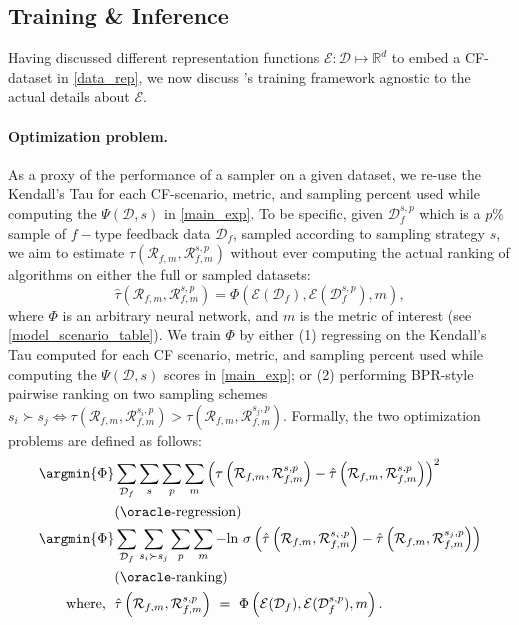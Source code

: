 \subsection{Training \& Inference} \label{oracle_architecture}
Having discussed different representation functions $\mathcal{E} : \mathcal{D} \mapsto \mathbb{R}^d$ to embed a CF-dataset in \cref{data_rep}, we now discuss \oracle's training framework agnostic to the actual details about $\mathcal{E}$. 

\paragraph{Optimization problem.} As a proxy of the performance of a sampler on a given dataset, we re-use the Kendall's Tau for each CF-scenario, metric, and sampling percent used while computing the $\Psi(\mathcal{D}, s)$ in \cref{main_exp}. To be specific, given $\mathcal{D}_{f}^{s, p}$ which is a $p\%$ sample of $f-$type feedback data $\mathcal{D}_f$, sampled according to sampling strategy $s$, we aim to estimate $\tau(\mathcal{R}_{f, m}, \mathcal{R}_{f, m}^{s, p})$ without ever computing the actual ranking of algorithms 
on either the full or sampled datasets:
\begin{equation} \label{tau_hat}
    \hat{\tau}\left(\mathcal{R}_{f, m}, \mathcal{R}_{f, m}^{s, p}\right) = \Phi\left(\mathcal{E}(\mathcal{D}_f), \mathcal{E}(\mathcal{D}_f^{s, p}), m\right),
\end{equation}
where $\Phi$ is an arbitrary neural network, and $m$ is the metric of interest (see \cref{model_scenario_table}). We train $\Phi$ by either (1) regressing on the Kendall's Tau computed for each CF scenario, metric, and sampling percent used while computing the $\Psi(\mathcal{D}, s)$ scores in \cref{main_exp}; or (2) performing BPR-style \cite{bpr} pairwise ranking on two sampling schemes $s_i \succ s_j \iff \tau(\mathcal{R}_{f, m}, \mathcal{R}_{f, m}^{s_i, p}) > \tau(\mathcal{R}_{f, m}, \mathcal{R}_{f, m}^{s_j, p})$. Formally, the two optimization problems are defined as follows:
\begin{align*}
    \argmin{\Phi} & \sum_{\mathcal{D}_f} \sum_{s} \sum_{p} \sum_{m} \left(\tau\left(\mathcal{R}_{f, m}, \mathcal{R}_{f, m}^{s, p}\right) - \hat{\tau}\left(\mathcal{R}_{f, m}, \mathcal{R}_{f, m}^{s, p}\right) \right)^2 \\ & \text{(\oracle-regression)} \\
    \argmin{\Phi} & \sum_{\mathcal{D}_f} \sum_{s_i \succ s_j} \sum_{p} \sum_{m} -\text{ln}~\sigma\left(\hat{\tau}\left(\mathcal{R}_{f, m}, \mathcal{R}_{f, m}^{s_i, p}\right) - \hat{\tau}\left(\mathcal{R}_{f, m}, \mathcal{R}_{f, m}^{s_j, p}\right) \right) \\ & \text{(\oracle-ranking)} \\
    \text{where, \;} & \hat{\tau}\left(\mathcal{R}_{f, m}, \mathcal{R}_{f, m}^{s, p}\right) ~=~ \Phi\left(\mathcal{E}(\mathcal{D}_f), \mathcal{E}(\mathcal{D}_f^{s, p}), m\right).
\end{align*}
